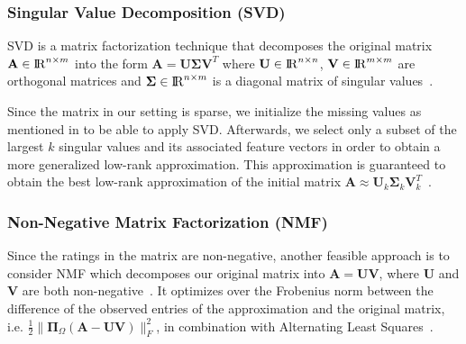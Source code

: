 \documentclass[10pt,conference,compsocconf]{IEEEtran}
\begin{document}
    \subsubsection{Singular Value Decomposition \textbf{(SVD)}}

    SVD is a matrix factorization technique that decomposes the original matrix $\mathbf{A} \in {\rm I\!R}^{n \times m} $ into the form $ \mathbf{A} = \mathbf{U \Sigma V}^T $ where $\mathbf{U} \in {\rm I\!R}^{n \times n}$,  $\mathbf{V}  \in {\rm I\!R}^{m \times m}$ are orthogonal matrices and $\mathbf{\Sigma} \in {\rm I\!R}^{n \times m}$ is a diagonal matrix of singular values~\cite{svd}.

    Since the matrix in our setting is sparse, we initialize the missing values as mentioned in  to be able to apply SVD.
    Afterwards, we select only a subset of the largest $k$ singular values and its associated feature vectors in order to obtain a more generalized low-rank approximation.
    This approximation is guaranteed to obtain the best low-rank approximation of the initial matrix $\mathbf{A}\approx \mathbf{U}_k \mathbf{\Sigma}_k \mathbf{V}^T_k$~\cite{Eckart1936}.

    \subsubsection{Non-Negative Matrix Factorization \textbf{(NMF)}}

    Since the ratings in the matrix are non-negative, another feasible approach is to consider NMF which decomposes our original matrix into $\mathbf{A} = \mathbf{UV}$, where $\mathbf{U}$ and $\mathbf{V}$ are both non-negative~\cite{gillis2014nonnegative}.
    It optimizes over the Frobenius norm between the difference of the observed entries of the approximation and the original matrix, i.e. $ \frac{1}{2}\|\mathbf{\Pi}_{\Omega}(\mathbf{A} - \mathbf{UV})\|^2_F$, in combination with Alternating Least Squares~\cite{als}.
\end{document}
